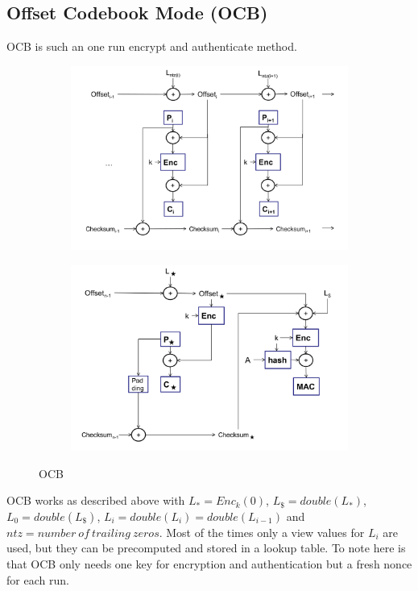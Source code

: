 \subsection{Offset Codebook Mode (OCB)}
OCB is such an one run encrypt and authenticate method.
\begin{figure}[H]
\centering
\begin{subfigure}{.5\textwidth}
  \centering
  \includegraphics[width=\textwidth]{figures/ocb_encryption.png}
\end{subfigure}%
\begin{subfigure}{.5\textwidth}
  \centering
  \includegraphics[width=\textwidth]{figures/ocb_mac.png}
\end{subfigure}
\caption{OCB}
\end{figure}
OCB works as described above with $L_* = Enc_k(0)$, $L_{\$} = double(L_*)$, $L_0 = double(L_{\$})$, $L_i = double(L_i) = double(L_{i-1})$ and $ntz = number~of~trailing~zeros$.
Most of the times only a view values for $L_i$ are used, but they can be precomputed and stored in a lookup table.
To note here is that OCB only needs one key for encryption and authentication but a fresh nonce for each run.

